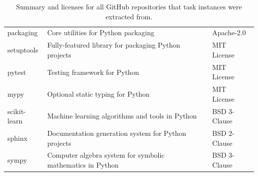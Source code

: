 \documentclass{article}
\def\name{FeatureBench }
\begin{document}
\begin{table}[h]
{\begin{tabular}{l|>{\raggedright\arraybackslash}p{8cm}|l}
    packaging & Core utilities for Python packaging & Apache-2.0 \\
    setuptools & Fully-featured library for packaging Python projects & MIT License \\
    pytest & Testing framework for Python & MIT License \\
    mypy & Optional static typing for Python & MIT License \\
    scikit-learn & Machine learning algorithms and tools in Python & BSD 3-Clause \\
    sphinx & Documentation generation system for Python projects & BSD 2-Clause \\
    sympy & Computer algebra system for symbolic mathematics in Python & BSD 3-Clause \\
    \bottomrule
    \end{tabular}
    }
    \caption{Summary and licenses for all GitHub repositories that task instances were extracted from.}
    \label{tab:repo_summary}
\end{table}

\begin{table}[h]
    \centering
    \caption{Description of each field of a \name task instance object.}
    \label{tab:instance_info}
\end{table}
\end{document}
